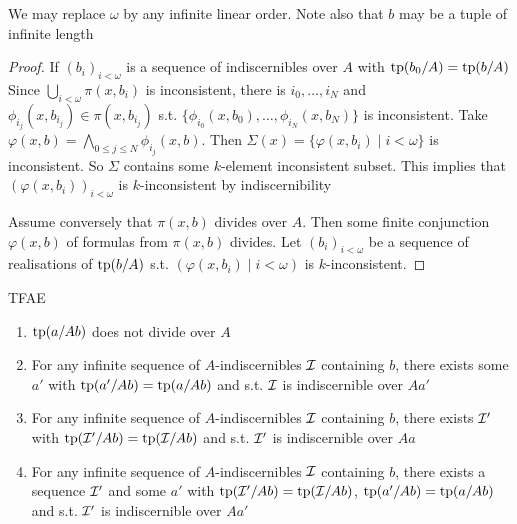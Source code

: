 \documentclass[11pt]{article}
\begin{document}
We may replace \(\omega\) by any infinite linear order. Note also that \(b\) may be a tuple of infinite length

\begin{proof}
If \((b_i)_{i<\omega}\) is a sequence of indiscernibles over \(A\) with \(\operatorname{tp}(b_0/A)=\operatorname{tp}(b/A)\)
Since \(\bigcup_{i<\omega}\pi(x,b_i)\) is inconsistent, there is \(i_0,\dots,i_N\)
and \(\phi_{i_j}(x,b_{i_j})\in\pi(x,b_{i_j})\) s.t. \(\{\phi_{i_0}(x,b_0),\dots,\phi_{i_N}(x,b_N)\}\) is
inconsistent. Take \(\varphi(x,b)=\bigwedge_{0\le j\le N}\phi_{i_j}(x,b)\). Then \(\Sigma(x)=\{\varphi(x,b_i)\mid i<\omega\}\) is inconsistent.
So \(\Sigma\) contains some \(k\)-element inconsistent subset. This implies that \((\varphi(x,b_i))_{i<\omega}\)
is \(k\)-inconsistent by indiscernibility


Assume conversely that \(\pi(x,b)\) divides over \(A\). Then some finite conjunction \(\varphi(x,b)\) of
formulas from \(\pi(x,b)\) divides. Let \((b_i)_{i<\omega}\) be a sequence of realisations
of \(\operatorname{tp}(b/A)\) s.t. \((\varphi(x,b_i)\mid i<\omega)\) is \(k\)-inconsistent.
\end{proof}


\begin{corollary}[]
TFAE
\begin{enumerate}
\item \(\operatorname{tp}(a/Ab)\) does not divide over \(A\)
\item For any infinite sequence of \(A\)-indiscernibles \(\mathcal{I}\) containing \(b\), there exists
some \(a'\) with \(\operatorname{tp}(a'/Ab)=\operatorname{tp}(a/Ab)\) and s.t. \(\mathcal{I}\) is indiscernible over \(Aa'\)
\item For any infinite sequence of \(A\)-indiscernibles \(\mathcal{I}\) containing \(b\), there exists \(\mathcal{I}'\)
with \(\operatorname{tp}(\mathcal{I}'/Ab)=\operatorname{tp}(\mathcal{I}/Ab)\) and s.t. \(\mathcal{I}'\) is indiscernible over \(Aa\)
\item For any infinite sequence of \(A\)-indiscernibles \(\mathcal{I}\)  containing \(b\), there exists a
sequence \(\mathcal{I}'\) and some \(a'\) with \(\operatorname{tp}(\mathcal{I}'/Ab)=\operatorname{tp}(\mathcal{I}/Ab)\), \(\operatorname{tp}(a'/Ab)=\operatorname{tp}(a/Ab)\) and
s.t. \(\mathcal{I}'\) is indiscernible over \(Aa'\)
\end{enumerate}
\end{corollary}
\end{document}
